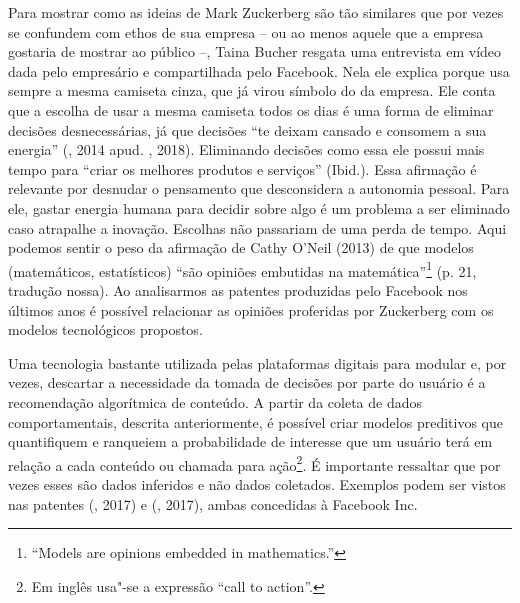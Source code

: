 Para mostrar como as ideias de Mark Zuckerberg são tão similares que por
vezes se confundem com ethos de sua empresa -- ou ao menos aquele que a
empresa gostaria de mostrar ao público --, Taina Bucher resgata uma
entrevista em vídeo dada pelo empresário e compartilhada pelo Facebook.
Nela ele explica porque usa sempre a mesma camiseta cinza, que já virou
símbolo do  da empresa. Ele conta que a escolha de usar a mesma
camiseta todos os dias é uma forma de eliminar decisões desnecessárias,
já que decisões ``te deixam cansado e consomem a sua energia''
(, 2014 apud. , 2018). Eliminando decisões como essa ele
possui mais tempo para ``criar os melhores produtos e serviços''
(Ibid.). Essa afirmação é relevante por desnudar o pensamento que
desconsidera a autonomia pessoal. Para ele, gastar energia humana para
decidir sobre algo é um problema a ser eliminado caso atrapalhe a
inovação. Escolhas não passariam de uma perda de tempo. Aqui podemos
sentir o peso da afirmação de Cathy O'Neil (2013) de que modelos
(matemáticos, estatísticos) ``são opiniões embutidas na
matemática''\footnote{``Models are opinions embedded in mathematics.''}
(p. 21, tradução nossa). Ao analisarmos as patentes produzidas pelo
Facebook nos últimos anos é possível relacionar as opiniões proferidas
por Zuckerberg com os modelos tecnológicos propostos.

Uma tecnologia bastante utilizada pelas plataformas digitais para
modular e, por vezes, descartar a necessidade da tomada de decisões por
parte do usuário é a recomendação algorítmica de conteúdo. A partir da
coleta de dados comportamentais, descrita anteriormente, é possível
criar modelos preditivos que quantifiquem e ranqueiem a probabilidade de
interesse que um usuário terá em relação a cada conteúdo ou chamada para
ação\footnote{Em inglês usa"-se a expressão ``call to action''.}. É
importante ressaltar que por vezes esses são dados inferidos e não dados
coletados. Exemplos podem ser vistos nas patentes  (,
2017) e  (, 2017), ambas concedidas à Facebook
Inc.

